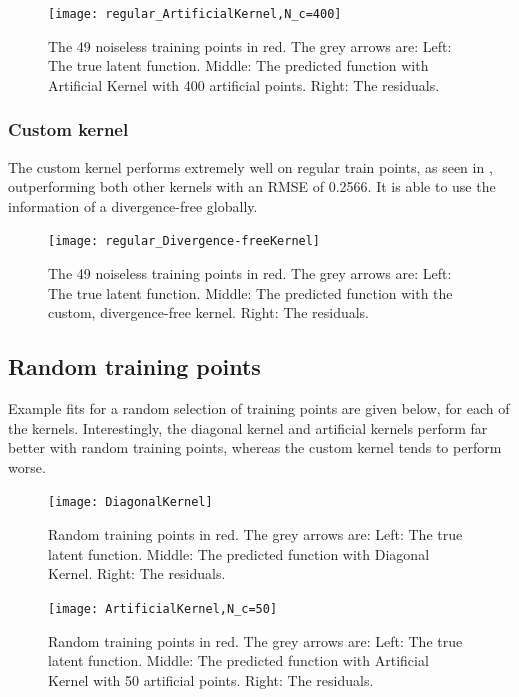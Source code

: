 \documentclass[12pt,a4paper,twoside]{report}
\theoremstyle{definition}
\begin{document}
\begin{figure}[ht]
	\centering
	\texttt{[image: regular\_ArtificialKernel,N\_c=400]}
	\caption[Artificial kernel (400 inducing points), regular training points]{The 49 noiseless training points in red. The grey arrows are: Left: The true latent function. Middle: The predicted function with Artificial Kernel with 400 artificial points. Right: The residuals.}
	\label{regartif400}
\end{figure}

\subsubsection{Custom kernel}
The custom kernel performs extremely well on regular train points, as seen in , outperforming both other kernels with an RMSE of 0.2566. It is able to use the information of a divergence-free globally.

\begin{figure}[ht]
	\centering
	\texttt{[image: regular\_Divergence-freeKernel]}
	\caption[Custom, regular training points]{The 49 noiseless training points in red. The grey arrows are: Left: The true latent function. Middle: The predicted function with the custom, divergence-free kernel. Right: The residuals.}
	\label{fig:cust}
\end{figure}


\clearpage
\subsection{Random training points}
Example fits for a random selection of training points are given below, for each of the kernels. Interestingly, the diagonal kernel and artificial kernels perform far better with random training points, whereas the custom kernel tends to perform worse.

\begin{figure}[ht]
	\centering
	\texttt{[image: DiagonalKernel]}
	\caption[Diagonal kernel, random training points]{Random training points in red. The grey arrows are: Left: The true latent function. Middle: The predicted function with Diagonal Kernel. Right: The residuals.}
	\label{diag}
\end{figure}


\begin{figure}[ht]
	\centering
	\texttt{[image: ArtificialKernel,N\_c=50]}
	\caption[Artificial kernel (50 inducing points), random training points]{Random training points in red. The grey arrows are: Left: The true latent function. Middle: The predicted function with Artificial Kernel with 50 artificial points. Right: The residuals.}
	\label{artif50}
\end{figure}
\end{document}
